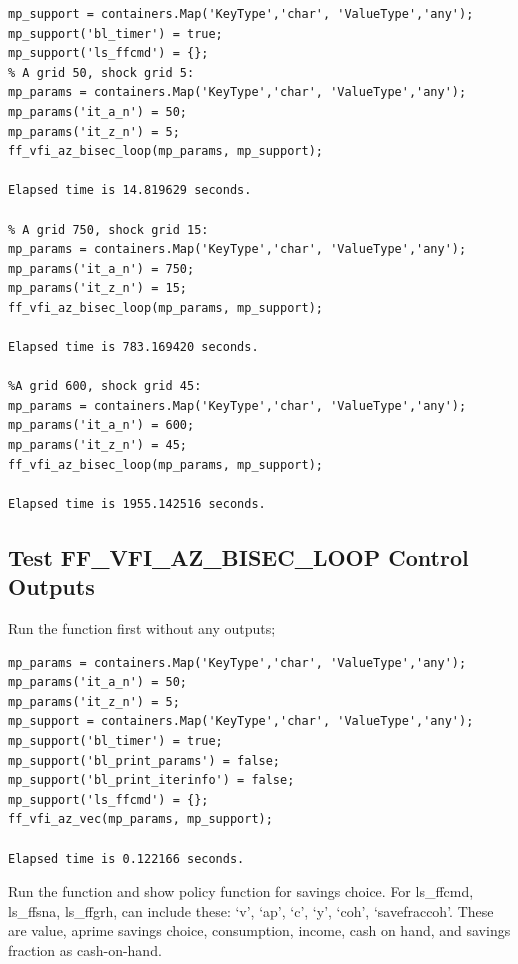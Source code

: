\documentclass[
]{book}
\begin{document}
\begin{verbatim}
mp_support = containers.Map('KeyType','char', 'ValueType','any');
mp_support('bl_timer') = true;
mp_support('ls_ffcmd') = {};
% A grid 50, shock grid 5:
mp_params = containers.Map('KeyType','char', 'ValueType','any');
mp_params('it_a_n') = 50;
mp_params('it_z_n') = 5;
ff_vfi_az_bisec_loop(mp_params, mp_support);

Elapsed time is 14.819629 seconds.

% A grid 750, shock grid 15:
mp_params = containers.Map('KeyType','char', 'ValueType','any');
mp_params('it_a_n') = 750;
mp_params('it_z_n') = 15;
ff_vfi_az_bisec_loop(mp_params, mp_support);

Elapsed time is 783.169420 seconds.

%A grid 600, shock grid 45:
mp_params = containers.Map('KeyType','char', 'ValueType','any');
mp_params('it_a_n') = 600;
mp_params('it_z_n') = 45;
ff_vfi_az_bisec_loop(mp_params, mp_support);

Elapsed time is 1955.142516 seconds.
\end{verbatim}

\hypertarget{test-ff_vfi_az_bisec_loop-control-outputs}{%
\subsection{Test FF\_VFI\_AZ\_BISEC\_LOOP Control Outputs}\label{test-ff_vfi_az_bisec_loop-control-outputs}}

Run the function first without any outputs;

\begin{verbatim}
mp_params = containers.Map('KeyType','char', 'ValueType','any');
mp_params('it_a_n') = 50;
mp_params('it_z_n') = 5;
mp_support = containers.Map('KeyType','char', 'ValueType','any');
mp_support('bl_timer') = true;
mp_support('bl_print_params') = false;
mp_support('bl_print_iterinfo') = false;
mp_support('ls_ffcmd') = {};
ff_vfi_az_vec(mp_params, mp_support);

Elapsed time is 0.122166 seconds.
\end{verbatim}

Run the function and show policy function for savings choice. For
ls\_ffcmd, ls\_ffsna, ls\_ffgrh, can include these: `v', `ap', `c', `y',
`coh', `savefraccoh'. These are value, aprime savings choice,
consumption, income, cash on hand, and savings fraction as cash-on-hand.
\end{document}
